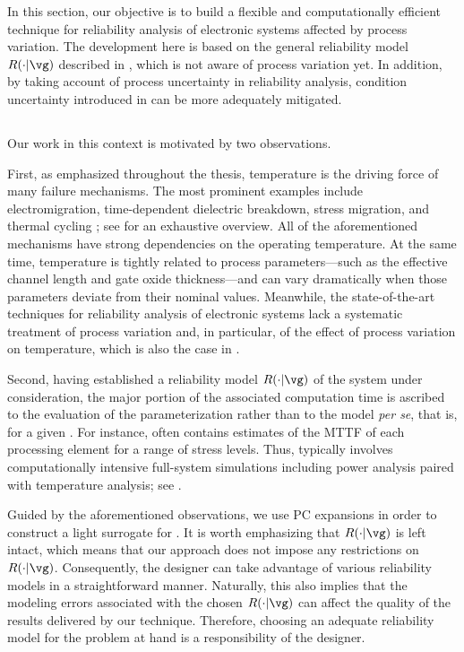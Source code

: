 In this section, our objective is to build a flexible and computationally
efficient technique for reliability analysis of electronic systems affected by
process variation. The development here is based on the general reliability
model $R(\cdot | \vg)$ described in , which is not aware
of process variation yet. In addition, by taking account of process uncertainty
in reliability analysis, condition uncertainty introduced in
 can be more adequately mitigated.

\subsection{\problemtitle}

Our work in this context is motivated by two observations.

First, as emphasized throughout the thesis, temperature is the driving force of
many failure mechanisms. The most prominent examples include electromigration,
time-dependent dielectric breakdown, stress migration, and thermal cycling
\cite{xiang2010}; see \cite{jedec2016} for an exhaustive overview. All of the
aforementioned mechanisms have strong dependencies on the operating temperature.
At the same time, temperature is tightly related to process parameters---such as
the effective channel length and gate oxide thickness---and can vary
dramatically when those parameters deviate from their nominal values. Meanwhile,
the state-of-the-art techniques for reliability analysis of electronic systems
lack a systematic treatment of process variation and, in particular, of the
effect of process variation on temperature, which is also the case in
.

Second, having established a reliability model $R(\cdot | \vg)$ of the system
under consideration, the major portion of the associated computation time is
ascribed to the evaluation of the parameterization \vg rather than to the model
\emph{per se}, that is, for a given \vg. For instance, \vg often contains
estimates of the \ac{MTTF} of each processing element for a range of stress
levels. Thus, \vg typically involves computationally intensive full-system
simulations including power analysis paired with temperature analysis; see
.

Guided by the aforementioned observations, we use \ac{PC} expansions in order to
construct a light surrogate for \vg. It is worth emphasizing that $R(\cdot |
\vg)$ is left intact, which means that our approach does not impose any
restrictions on $R(\cdot | \vg)$. Consequently, the designer can take advantage
of various reliability models in a straightforward manner. Naturally, this also
implies that the modeling errors associated with the chosen $R(\cdot | \vg)$ can
affect the quality of the results delivered by our technique. Therefore,
choosing an adequate reliability model for the problem at hand is a
responsibility of the designer.

